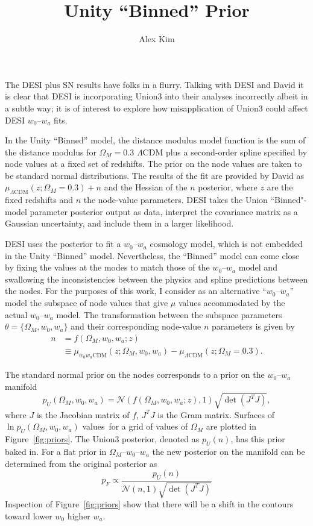 \documentclass[11pt, oneside]{article}   	%
\title{Unity ``Binned'' Prior}
\author{Alex Kim}
\begin{document}
\maketitle

The DESI plus SN results have folks in a flurry.  Talking with DESI and David it is clear that DESI is incorporating Union3
into their analyses incorrectly albeit in a subtle way;  it is of interest to explore how misapplication
of Union3 could affect  DESI $w_0$--$w_a$  fits.

In the Unity ``Binned'' model, the distance modulus model function
is the sum of the distance modulus for $\Omega_M=0.3$  $\Lambda$CDM plus a second-order spline specified by node values
at a fixed set of redshifts.  The prior on the node values are taken to be standard normal distributions.  The results of the fit are provided by David as
$\mu_{\Lambda \text{CDM}}(z;\Omega_M=0.3) + n$ and the  Hessian of the $n$ posterior,
where $z$ are the fixed redshifts and $n$ the node-value parameters.
DESI takes the Union ``Binned"-model parameter posterior output as data, interpret the covariance matrix as a Gaussian uncertainty,
and include them in a larger likelihood. 

DESI uses the posterior to fit a $w_0$--$w_a$ cosmology model, which is not embedded in the Unity ``Binned'' model.  Nevertheless,
the ``Binned'' model can come close by fixing the values at the modes to match those of the $w_0$--$w_a$  model and swallowing the
inconsistencies between the physics and spline predictions between the nodes.  For the purposes of this work, I consider
as an alternative  ``$w_0$--$w_a$'' model  the subspace of node values that give
$\mu$ values accommodated by the actual $w_0$--$w_a$
model.  The transformation between the subspace parameters $\theta=\{\Omega_M, w_0, w_a\}$ and their corresponding
node-value $n$ parameters is given by
\begin{align}
	n &= f(\Omega_M, w_0, w_a; z) \\
	& \equiv \mu_{w_0 w_a \text{CDM}}(z;\Omega_M, w_0, w_a)  - \mu_{\Lambda \text{CDM}}(z;\Omega_M=0.3).
\end{align}

The standard normal prior on the nodes corresponds to a prior on the  $w_0$--$w_a$ manifold
\begin{equation}
p_U(\Omega_M, w_0,w_a) = \mathcal{N}(f(\Omega_M, w_0, w_a; z),1)  \sqrt{\det{\left(J^T J\right)}},
\end{equation}
where $J$ is the Jacobian matrix of $f$, $J^TJ$ is the Gram matrix.
Surfaces of $\ln{p_U}(\Omega_M, w_0,w_a)$ values\ for a grid of values of $\Omega_M$
are plotted in Figure~\ref{fig:priors}.
The Union3 posterior, denoted as $p_U(n)$, has this prior baked in.  For a flat prior in $\Omega_M$--$w_0$--$w_a$
the new posterior on the manifold can be determined from the original posterior as
\begin{equation}
p_F \propto \frac{p_U(n)}{\mathcal{N}(n,1)  \sqrt{\det{\left(J^T J\right)}}}
\end{equation}
Inspection of Figure~\ref{fig:priors} show that there will be a shift in the contours toward lower $w_0$ higher $w_a$.
\end{document}
